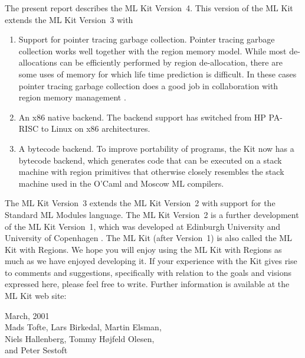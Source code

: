 \documentclass[12pt]{book}
\begin{document}
The present report describes the 
%
ML Kit Version~4. This version of the ML Kit extends the 
ML Kit Version~3 with
\begin{enumerate}
\item Support for pointer tracing garbage collection. Pointer tracing
  garbage collection works well together with the region memory model.
  While most de-allocations can be efficiently performed by region
  de-allocation, there are some uses of memory for which life time
  prediction is difficult. In these cases pointer tracing garbage
  collection does a good job in collaboration with region memory
  management \cite{hallenberg99}.
\item An x86 native backend. The 
  backend support has switched from HP PA-RISC to Linux on x86
  architectures.
  
\item A 
  bytecode backend. To improve portability of programs, the Kit now
  has a bytecode backend, which generates code that can be executed on
  a stack machine with region primitives that otherwise closely
  resembles the stack machine used in the O'Caml and Moscow ML
  compilers.
\end{enumerate}

The 
%
ML Kit Version~3 extends the ML Kit Version~2 with support for the
Standard ML Modules language. The
%
ML Kit Version~2 is a further development of the 
%
ML Kit Version~1, which was developed at Edinburgh University and
University of Copenhagen \cite{brtt93}.  The ML Kit (after Version~1)
is also called the ML Kit with Regions.  We hope you will enjoy using
the ML Kit with Regions as much as we have enjoyed developing it. If
your experience with the Kit gives rise to comments and suggestions,
specifically with relation to the goals and visions expressed here,
please feel free to write.  Further information is available at the ML
Kit
%
web site:
\begin{tabbing}
\hskip2cm
\end{tabbing}

\begin{flushright}
March, 2001\\[1cm]
Mads Tofte, Lars Birkedal, Martin Elsman,\\
Niels Hallenberg, Tommy H\o jfeld Olesen,\\
and Peter Sestoft
\end{flushright}
\end{document}
